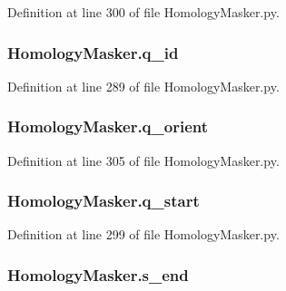 Definition at line 300 of file Homology\-Masker.\-py.

\hypertarget{namespaceHomologyMasker_a7ed6087cd5b71af36e04fc7b14404fbf}{
\subsubsection[{q\-\_\-id}]{\setlength{\rightskip}{0pt plus 5cm}Homology\-Masker.\-q\-\_\-id}}\label{namespaceHomologyMasker_a7ed6087cd5b71af36e04fc7b14404fbf}


Definition at line 289 of file Homology\-Masker.\-py.

\hypertarget{namespaceHomologyMasker_ad6a4071a914fba5ea7d3dce772e64064}{
\subsubsection[{q\-\_\-orient}]{\setlength{\rightskip}{0pt plus 5cm}Homology\-Masker.\-q\-\_\-orient}}\label{namespaceHomologyMasker_ad6a4071a914fba5ea7d3dce772e64064}


Definition at line 305 of file Homology\-Masker.\-py.

\hypertarget{namespaceHomologyMasker_a7801a7e7e88a2f65eb24d1bf21ff9e40}{
\subsubsection[{q\-\_\-start}]{\setlength{\rightskip}{0pt plus 5cm}Homology\-Masker.\-q\-\_\-start}}\label{namespaceHomologyMasker_a7801a7e7e88a2f65eb24d1bf21ff9e40}


Definition at line 299 of file Homology\-Masker.\-py.

\hypertarget{namespaceHomologyMasker_a8ee2b993d4ff09d2b322b7511dfad6e9}{
\subsubsection[{s\-\_\-end}]{\setlength{\rightskip}{0pt plus 5cm}Homology\-Masker.\-s\-\_\-end}}\label{namespaceHomologyMasker_a8ee2b993d4ff09d2b322b7511dfad6e9}


